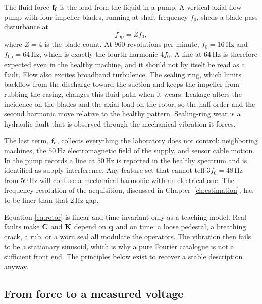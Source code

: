The fluid force \(\mathbf{f}_{\mathrm{f}}\) is the load from the liquid in a pump.
A vertical axial-flow pump with four impeller blades, running at shaft frequency \(f_0\), sheds a blade-pass disturbance at
\begin{equation}
f_{\mathrm{bp}}=Z f_0,
\label{eq:bpfreq}
\end{equation}
where \(Z=4\) is the blade count.
At \(960\) revolutions per minute, \(f_0=16\,\mathrm{Hz}\) and \(f_{\mathrm{bp}}=64\,\mathrm{Hz}\), which is exactly the fourth harmonic \(4f_0\).
A line at \(64\,\mathrm{Hz}\) is therefore expected even in the healthy machine, and it should not by itself be read as a fault.
Flow also excites broadband turbulence.
The sealing ring, which limits backflow from the discharge toward the suction and keeps the impeller from rubbing the casing, changes this fluid path when it wears.
Leakage alters the incidence on the blades and the axial load on the rotor, so the half-order and the second harmonic move relative to the healthy pattern.
Sealing-ring wear is a hydraulic fault that is observed through the mechanical vibration it forces.

The last term, \(\mathbf{f}_{\mathrm{e}}\), collects everything the laboratory does not control: neighboring machines, the \(50\,\mathrm{Hz}\) electromagnetic field of the supply, and sensor cable motion.
In the pump records a line at \(50\,\mathrm{Hz}\) is reported in the healthy spectrum and is identified as supply interference.
Any feature set that cannot tell \(3f_0=48\,\mathrm{Hz}\) from \(50\,\mathrm{Hz}\) will confuse a mechanical harmonic with an electrical one.
The frequency resolution of the acquisition, discussed in Chapter~\ref{ch:estimation}, has to be finer than that \(2\,\mathrm{Hz}\) gap.

Equation \eqref{eq:rotor} is linear and time-invariant only as a teaching model.
Real faults make \(\mathbf{C}\) and \(\mathbf{K}\) depend on \(\mathbf{q}\) and on time: a loose pedestal, a breathing crack, a rub, or a worn seal all modulate the operators.
The vibration then fails to be a stationary sinusoid, which is why a pure Fourier catalogue is not a sufficient front end.
The principles below exist to recover a stable description anyway.

\subsection{From force to a measured voltage}

